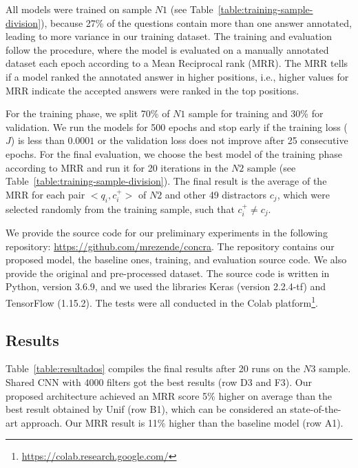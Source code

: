 \documentclass[sigconf]{acmart}
\begin{document}
All models were trained on sample $N1$ (see Table~\ref{table:training-sample-division}), because 27\% of the questions contain more than one answer annotated, leading to more variance in our training dataset. The training and evaluation follow the \citet{iyer-etal-2016-summarizing} procedure, where the model is evaluated on a manually annotated dataset each epoch according to a Mean Reciprocal rank (MRR). The MRR tells if a model ranked the annotated answer in higher positions, i.e., higher values for MRR indicate the accepted answers were ranked in the top positions.

For the training phase, we split 70\% of $N1$ sample for training and 30\% for validation. We run the models for 500 epochs and stop early if the training loss ($J$) is less than $0.0001$ or the validation loss does not improve after 25 consecutive epochs. For the final evaluation, we choose the best model of the training phase according to MRR and run it for 20 iterations in the $N2$ sample (see Table~\ref{table:training-sample-division}). The final result is the average of the MRR for each pair $<q_{i}, c_{i}^{+}>$ of $N2$ and other 49 distractors $c_{j}$, which were selected randomly from the training sample, such that $c_{i}^{+} \neq c_{j}$.

We provide the source code for our preliminary experiments in the following repository: \url{https://github.com/mrezende/concra}. The repository contains our proposed model, the baseline ones, training, and evaluation source code. We also provide the original and pre-processed dataset. The source code is written in Python, version 3.6.9, and we used the libraries Keras (version 2.2.4-tf) and TensorFlow (1.15.2). The tests were all conducted in the Colab platform\footnote{\url{https://colab.research.google.com/}}.

\subsection{Results}

 Table~\ref{table:resultados} compiles the final results after 20 runs on the $N3$ sample. Shared CNN with 4000 filters got the best results (row D3 and F3). Our proposed architecture achieved an MRR score 5\% higher on average than the best result obtained by Unif (row B1), which can be considered an state-of-the-art approach. Our MRR result is 11\% higher than the baseline model (row A1). 
\end{document}
